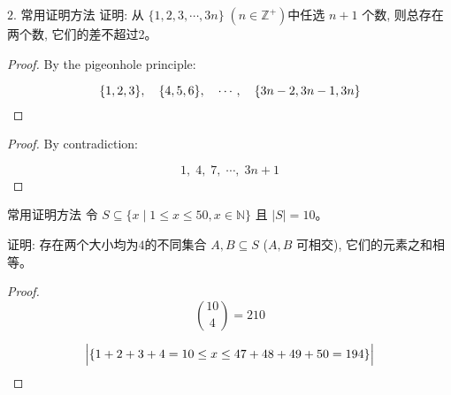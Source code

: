 \begin{frame}{}
  \begin{exampleblock}{$2.$ 常用证明方法}
    证明: 从 $\{1,2,3, \cdots, 3n\}\; (n \in \mathbb{Z}^{+})$中任选 $n+1$ 个数, 则总存在两个数, 它们的差不超过2。
  \end{exampleblock}

  \pause
  \begin{proof}
    By the pigeonhole principle:

    \pause
    \[
      \{1,2,3\},\quad \{4,5,6\},\quad\cdots,\quad \{3n-2, 3n-1, 3n\}
    \]

  \end{proof}

  \pause
  \vspace{0.10cm}
  \begin{proof}
    By contradiction:

    \pause
    \[
      1,\; 4,\; 7,\; \cdots,\; 3n + 1 
    \]
  \end{proof}
\end{frame}

\begin{frame}{}
  \begin{exampleblock}{常用证明方法}
    令 $S \subseteq \{x \mid 1 \le x \le 50, x \in \mathbb{N}\}$ 且 $|S| = 10$。
    
    证明: 存在两个大小均为$4$的不同集合 $A, B \subseteq S$ ($A, B$ 可相交),
    它们的元素之和相等。
  \end{exampleblock}

  \pause
  \begin{proof}
    \[
      \binom{10}{4} = 210
    \]

    \centerline{}

    \[
      \Big\lvert \{1+2+3+4=10 \le x \le 47+48+49+50 = 194\} \Big\rvert
    \]
  \end{proof}
\end{frame}
